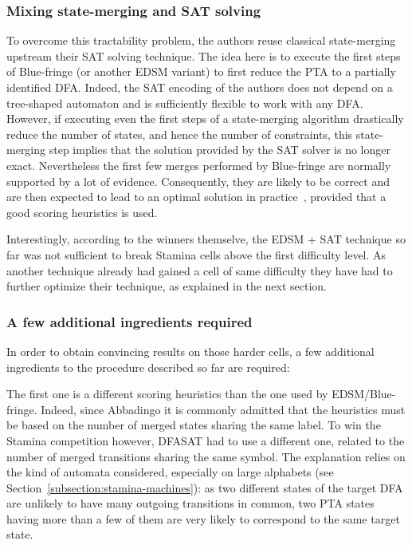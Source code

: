 \subsubsection*{Mixing state-merging and SAT solving}

To overcome this tractability problem, the authors reuse classical state-merging upstream their SAT solving technique. The idea here is to execute the first steps of Blue-fringe (or another EDSM variant) to first reduce the PTA to a partially identified DFA. Indeed, the SAT encoding of the authors does not depend on a tree-shaped automaton and is sufficiently flexible to work with any DFA. However, if executing even the first steps of a state-merging algorithm drastically reduce the number of states, and hence the number of constraints, this state-merging step implies that the solution provided by the SAT solver is no longer exact. Nevertheless the first few merges performed by Blue-fringe are normally supported by a lot of evidence. Consequently, they are likely to be correct and are then expected to lead to an optimal solution in practice~\cite{Heule:2010}, provided that a good scoring heuristics is used. 

Interestingly, according to the winners themselve, the EDSM + SAT technique so far was not sufficient to break Stamina cells above the first difficulty level. As another technique already had gained a cell of same difficulty they have had to further optimize their technique, as explained in the next section.

\subsubsection*{A few additional ingredients required}

In order to obtain convincing results on those harder cells, a few additional ingredients to the procedure described so far are required:

The first one is a different scoring heuristics than the one used by EDSM/Blue-fringe. Indeed, since Abbadingo it is commonly admitted that the heuristics must be based on the number of merged states sharing the same label. To win the Stamina competition however, DFASAT had to use a different one, related to the number of merged transitions sharing the same symbol. The explanation relies on the kind of automata considered, especially on large alphabets (see Section~\ref{subsection:stamina-machines}): as two different states of the target DFA are unlikely to have many outgoing transitions in common, two PTA states having more than a few of them are very likely to correspond to the same target state.

